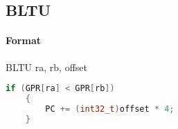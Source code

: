 \subsection{BLTU}


\paragraph{Format} BLTU ra, rb, offset

\begin{lstlisting}[language=c]
    if (GPR[ra] < GPR[rb])
    {
        PC += (int32_t)offset * 4;
    }
\end{lstlisting}
